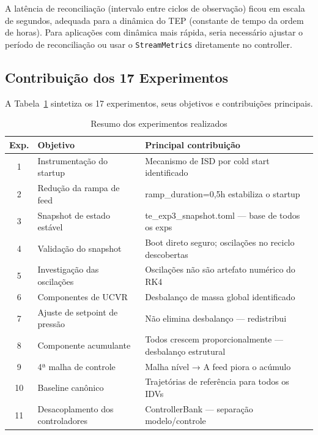 A latência de reconciliação (intervalo entre ciclos de observação) ficou em escala de segundos, adequada para a dinâmica do TEP (constante de tempo da ordem de horas). Para aplicações com dinâmica mais rápida, seria necessário ajustar o período de reconciliação ou usar o \texttt{StreamMetrics} diretamente no controller.

\subsection{Contribuição dos 17 Experimentos}

A Tabela~\ref{tab:experimentos_resumo} sintetiza os 17 experimentos, seus objetivos e contribuições principais.

\begin{table}[ht!]
\centering
\caption{Resumo dos experimentos realizados}
\label{tab:experimentos_resumo}
\begin{tabular}{|c|l|l|}
\hline
\textbf{Exp.} & \textbf{Objetivo}                             & \textbf{Principal contribuição}                        \\
\hline
1  & Instrumentação do startup              & Mecanismo de ISD por cold start identificado           \\
2  & Redução da rampa de feed               & ramp\_duration=0,5h estabiliza o startup               \\
3  & Snapshot de estado estável             & te\_exp3\_snapshot.toml — base de todos os exps        \\
4  & Validação do snapshot                  & Boot direto seguro; oscilações no reciclo descobertas  \\
5  & Investigação das oscilações            & Oscilações não são artefato numérico do RK4            \\
6  & Componentes de UCVR                    & Desbalanço de massa global identificado                \\
7  & Ajuste de setpoint de pressão          & Não elimina desbalanço — redistribui                   \\
8  & Componente acumulante                  & Todos crescem proporcionalmente — desbalanço estrutural \\
9  & 4ª malha de controle                   & Malha nível → A feed piora o acúmulo                   \\
10 & Baseline canônico                      & Trajetórias de referência para todos os IDVs           \\
11 & Desacoplamento dos controladores       & ControllerBank — separação modelo/controle             \\

\end{tabular}
\end{table}
